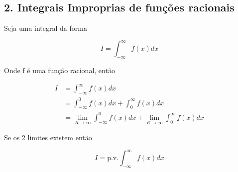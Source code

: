 \documentclass{article}
\begin{document}
\subsection*{2. Integrais Improprias de funções racionais}
Seja uma integral da forma

\begin{equation*}
    I = \int_{-\infty}^\infty f(x) d x
\end{equation*}

Onde f é uma função racional, então

\begin{align*}
    I &= \int_{-\infty}^\infty f(x) d x \\
    &= \int_{- \infty}^0 f(x) d x + \int_0^\infty f(x) d x \\
    &= \lim_{R \to \infty} \int_{- \infty}^0 f(x) d x + \lim_{R \to \infty} \int_0^\infty f(x) d x 
\end{align*}

Se os 2 limites existem então

\begin{equation*}
    I = \mathrm{p.v.} \int_{- \infty}^\infty f(x) d x
\end{equation*}
\end{document}
